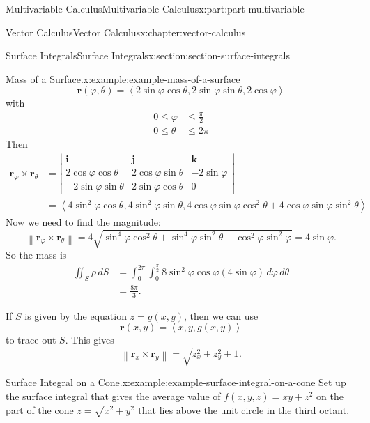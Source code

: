 \documentclass[twoside,10pt,]{book}
\numberwithin{equation}{part}
\newcommand{\vb}[1]{\mathbf{#1}}
\newcommand{\norm}[1]{\left\| #1 \right\|}
\newcommand{\dotprod}[1]{\left\langle #1 \right\rangle}
\newcommand{\amp}{&}
\begin{document}
\begin{partptx}{Multivariable Calculus}{}{Multivariable Calculus}{}{}{x:part:part-multivariable}
\begin{chapterptx}{Vector Calculus}{}{Vector Calculus}{}{}{x:chapter:vector-calculus}
\begin{sectionptx}{Surface Integrals}{}{Surface Integrals}{}{}{x:section:section-surface-integrals}
\begin{example}{Mass of a Surface.}{x:example:example-mass-of-a-surface}
\begin{equation*}
\vb{r}(\varphi,\theta) = \dotprod{2\sin\varphi\cos\theta, 2\sin\varphi\sin\theta, 2\cos\varphi}
\end{equation*}
with%
\begin{align*}
0\leq \varphi \amp \leq \frac{\pi}{2} \\
0\leq \theta \amp \leq 2\pi 
\end{align*}
Then%
\begin{align*}
\vb{r}_{\varphi}\times\vb{r}_{\theta} \amp= \left|\begin{array}{ccc} \vb{i} \amp \vb{j} \amp \vb{k} \\ 2\cos\varphi\cos\theta \amp 2\cos\varphi\sin\theta \amp -2\sin\varphi \\ -2\sin\varphi\sin\theta \amp 2\sin\varphi\cos\theta \amp 0\end{array}\right|\\
\amp= \dotprod{4\sin^{2}\varphi\cos\theta, 4\sin^{2}\varphi\sin\theta, 4\cos\varphi\sin\varphi\cos^{2}\theta + 4\cos\varphi\sin\varphi\sin^{2}\theta}
\end{align*}
Now we need to find the magnitude:%
\begin{equation*}
\norm{\vb{r}_{\varphi}\times\vb{r}_{\theta}} = 4\sqrt{\sin^{4}\varphi\cos^{2}\theta + \sin^{4}\varphi\sin^{2}\theta + \cos^{2}\varphi\sin^{2}\varphi} = 4\sin\varphi\text{.}
\end{equation*}
So the mass is%
\begin{align*}
\iint_{S}\rho\,dS \amp = \int_{0}^{2\pi}\int_{0}^{\frac{\pi}{2}}8\sin^{2}\varphi\cos\varphi(4\sin\varphi)\,d\varphi\,d\theta\\
\amp = \frac{8\pi}{3} \text{.}
\end{align*}
%
\end{example}
If \(S\) is given by the equation \(z = g(x,y)\), then we can use%
\begin{equation*}
\vb{r}(x,y) = \dotprod{x, y, g(x,y)}
\end{equation*}
to trace out \(S\). This gives%
\begin{equation*}
\norm{\vb{r}_{x}\times\vb{r}_{y}} = \sqrt{z_{x}^{2} + z_{y}^{2} + 1}\text{.}
\end{equation*}
%
\begin{example}{Surface Integral on a Cone.}{x:example:example-surface-integral-on-a-cone}%
Set up the surface integral that gives the average value of \(f(x,y,z) = xy + z^{2}\) on the part of the cone \(z = \sqrt{x^{2} + y^{2}}\) that lies above the unit circle in the third octant.%

\end{example}
\end{sectionptx}
\end{chapterptx}
\end{partptx}
\end{document}
